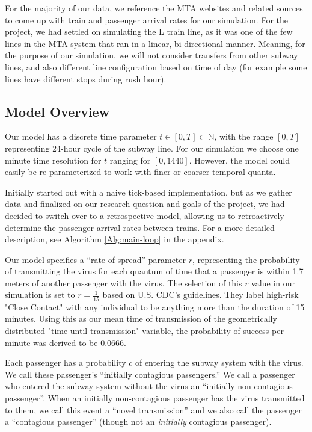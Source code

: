 \documentclass[12pt]{article}
\begin{document}
For the majority of our data, we reference the MTA websites and related sources to come up with train and passenger arrival rates for our simulation.
For the project, we had settled on simulating the L train line, as it was one of the few lines in the MTA system that ran in a linear, bi-directional manner.
Meaning, for the purpose of our simulation, we will not consider transfers from other subway lines, and also different line configuration based on time of day (for example some lines have different stops during rush hour). 

\subsection{Model Overview}

Our model has a discrete time parameter $t \in [0, T] \subset \mathbb{N}$, with the range $[0, T]$ representing 24-hour cycle of the subway line.
For our simulation we choose one minute time resolution for $t$ ranging for $[0, 1440]$.
However, the model could easily be re-parameterized to work with finer or coarser temporal quanta.

Initially started out with a naive tick-based implementation, but as we gather data and finalized on our research question and goals of the project, we had decided to switch over to a retrospective model, allowing us to retroactively determine the passenger arrival rates between trains. For a more detailed description, see Algorithm \ref{Alg:main-loop} in the appendix.

Our model specifies a ``rate of spread'' parameter $r$, representing the probability of transmitting the virus for each quantum of time that a passenger is within 1.7 meters of another passenger with the virus.
The selection of this $r$ value in our simulation is set to $r=\frac{1}{15}$ based on U.S. CDC's guidelines. They label high-risk "Close Contact" with any individual to be anything more than the duration of 15 minutes. Using this as our mean time of transmission of the geometrically distributed "time until transmission" variable, the probability of success per minute was derived to be $0.0666$.


Each passenger has a probability $c$ of entering the subway system with the virus.
We call these passenger's ``initially contagious passengers.''
We call a passenger who entered the subway system without the virus an ``initially non-contagious passenger''.
When an initially non-contagious passenger has the virus transmitted to them, we call this event a ``novel transmission'' and we also call the passenger a ``contagious passenger'' (though not an \emph{initially} contagious passenger).
\end{document}
